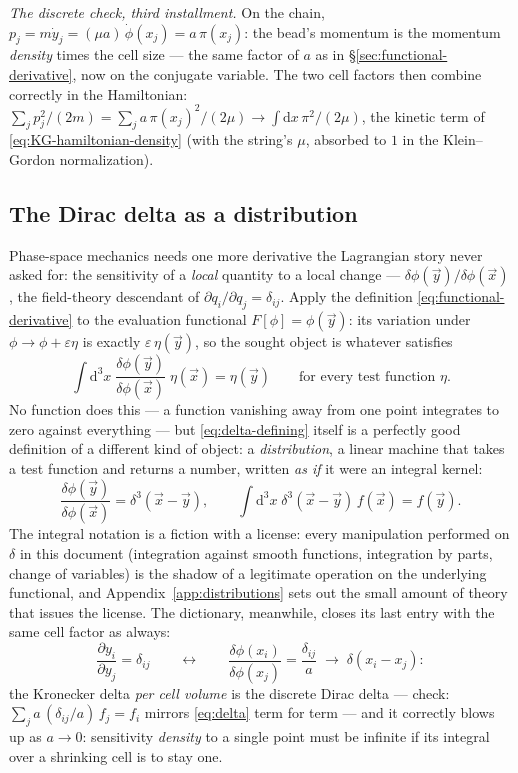 \documentclass[11pt]{article}
\theoremstyle{plain}
\theoremstyle{definition}
\theoremstyle{remark}
\newcommand{\dd}{\mathrm{d}}
\newcommand{\pd}[2]{\frac{\partial #1}{\partial #2}}
\newcommand{\vx}{\vec{x}}
\begin{document}
\emph{The discrete check, third installment.} On the chain,
$p_j = m\dot y_j = (\mu a)\,\dot\phi(x_j) = a\,\pi(x_j)$: the bead's
momentum is the momentum \emph{density} times the cell size --- the
same factor of $a$ as in \S\ref{sec:functional-derivative}, now on the
conjugate variable. The two cell factors then combine correctly in
the Hamiltonian:
$\sum_j p_j^2/(2m) = \sum_j a\,\pi(x_j)^2/(2\mu)
\to \int\dd x\, \pi^2/(2\mu)$, the kinetic term of
\eqref{eq:KG-hamiltonian-density} (with the string's $\mu$, absorbed
to $1$ in the Klein--Gordon normalization).

\subsection{The Dirac delta as a distribution}
\label{sec:dirac-delta}

Phase-space mechanics needs one more derivative the Lagrangian story
never asked for: the sensitivity of a \emph{local} quantity to a
local change --- $\delta\phi(\vec y)/\delta\phi(\vx)$, the field-theory
descendant of $\partial q_i/\partial q_j = \delta_{ij}$. Apply the
definition \eqref{eq:functional-derivative} to the evaluation
functional $F[\phi] = \phi(\vec y)$: its variation under
$\phi \to \phi + \varepsilon\eta$ is exactly $\varepsilon\,\eta(\vec y)$,
so the sought object is whatever satisfies
\begin{equation}
  \int \dd^3x\;
  \frac{\delta\phi(\vec y)}{\delta\phi(\vx)}\;
  \eta(\vx)
  = \eta(\vec y)
  \qquad\text{for every test function } \eta .
  \label{eq:delta-defining}
\end{equation}
No function does this --- a function vanishing away from one point
integrates to zero against everything --- but
\eqref{eq:delta-defining} itself is a perfectly good definition of a
different kind of object: a \emph{distribution}, a linear machine
that takes a test function and returns a number, written
\emph{as if} it were an integral kernel:
\begin{equation}
  \boxed{\;
  \frac{\delta\phi(\vec y)}{\delta\phi(\vx)}
  = \delta^3(\vx - \vec y),
  \qquad
  \int\dd^3 x\;\delta^3(\vx - \vec y)\,f(\vx) = f(\vec y).
  \;}
  \label{eq:delta}
\end{equation}
The integral notation is a fiction with a license: every manipulation
performed on $\delta$ in this document (integration against smooth
functions, integration by parts, change of variables) is the shadow
of a legitimate operation on the underlying functional, and
Appendix~\ref{app:distributions} sets out the small amount of theory
that issues the license. The dictionary, meanwhile, closes its last
entry with the same cell factor as always:
\begin{equation}
  \pd{y_i}{y_j} = \delta_{ij}
  \qquad\longleftrightarrow\qquad
  \frac{\delta\phi(x_i)}{\delta\phi(x_j)}
  = \frac{\delta_{ij}}{a}\;\to\;\delta(x_i - x_j) :
\end{equation}
the Kronecker delta \emph{per cell volume} is the discrete Dirac
delta --- check: $\sum_j a\,(\delta_{ij}/a)\,f_j = f_i$ mirrors
\eqref{eq:delta} term for term --- and it correctly blows up as
$a \to 0$: sensitivity \emph{density} to a single point must be
infinite if its integral over a shrinking cell is to stay one.
\end{document}
